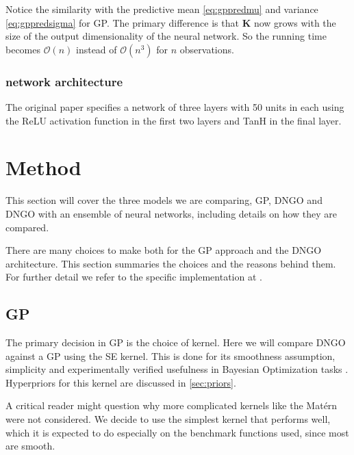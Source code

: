 \documentclass[conference,compsoc]{IEEEtran}
\theoremstyle{definition}
\begin{document}
        Notice the similarity with the predictive mean \eqref{eq:gppredmu} and variance \eqref{eq:gppredsigma} for GP.
        The primary difference is that $\bm{K}$ now grows with the size of the output dimensionality of the neural network.
        So the running time becomes $\mathcal{O}(n)$ instead of $\mathcal{O}(n^3)$ for $n$ observations. %

        \subsubsection{network architecture}\label{sec:dngoarch}
            
            The original paper specifies a network of three layers with 50 units in each using the ReLU activation function in the first two layers and TanH in the final layer.

\section{Method}\label{sec:method}

    This section will cover the three models we are comparing, GP, DNGO and DNGO with an ensemble of neural networks, including details on how they are compared.

    There are many choices to make both for the GP approach and the DNGO architecture.
    This section summaries the choices and the reasons behind them.
    For further detail we refer to the specific implementation at \parencite{thomas_m._pethick_ensembled_2018}.

    \subsection{GP}
        
        The primary decision in GP is the choice of kernel.
        Here we will compare DNGO against a GP using the SE kernel.
        This is done for its smoothness assumption, simplicity and experimentally verified usefulness in Bayesian Optimization tasks \parencite{snoek_practical_2012, wang_bayesian_2013, bergstra_algorithms_2011}.
        Hyperpriors for this kernel are discussed in \cref{sec:priors}.
        
        A critical reader might question why more complicated kernels like the Matérn \parencite{rasmussen_gaussian_2006} were not considered.
        We decide to use the simplest kernel that performs well, which it is expected to do especially on the benchmark functions used, since most are smooth.
\end{document}
